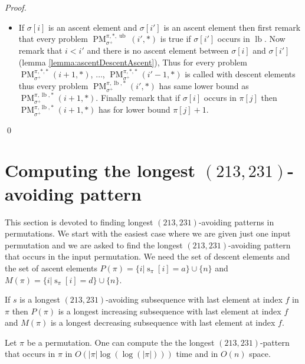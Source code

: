 \documentclass[a4paper]{llncs}
\newcommand{\ptext}{\pi}
\newcommand{\pmotif}{\sigma}
\DeclareMathOperator{\stripea}{s}
\newcommand{\stripe}[2]{\stripea_{{#1}}[{#2}]}
\newcommand{\dstep}{d}
\newcommand{\ustep}{a}
\newcommand{\pbmotif}{\pmotif^+}
\DeclareMathOperator{\PMa}{PM}
\newcommand{\PM}[6]{\PMa_{{#1}}^{{#2},{#3},{#4}}({#5},{#6})}
\DeclareMathOperator{\lb}{lb}
\DeclareMathOperator{\ub}{ub}
\begin{document}
\begin{proof}
\begin{itemize}
\begin{itemize}
			\item If $\pmotif[i]$ is an ascent element and $\pmotif[i']$ is an ascent element then
			first remark that every problem 
			$\PM{\pbmotif}{\ptext}{*}{\ub}{i'}{*}$ is true if $\sigma[i']$ occurs in $\lb$.
			Now remark that
			$i<i'$ and there is no  ascent element between $\pmotif[i]$ and $\pmotif[i']$ (lemma \ref{lemma:ascentDescentAscent}), 
			Thus for every problem $\PM{\pbmotif}{\ptext}{*}{*}{i+1}{*}$, $\dots$, $\PM{\pbmotif}{\ptext}{*}{*}{i'-1}{*}$ is called with descent elements
			thus every problem 
			$\PM{\pbmotif}{\ptext}{\lb}{*}{i'}{*}$ has same lower bound as $\PM{\pbmotif}{\ptext}{\lb}{*}{i+1}{*}$.
			Finally remark that if $\pmotif[i]$ occurs in $\ptext[j]$ then  $\PM{\pbmotif}{\ptext}{\lb}{*}{i+1}{*}$ has for lower bound $\ptext[j]+1$.			
		\end{itemize}
\end{itemize}
\qed
\end{proof}


\section{Computing the longest $(213,231)$-avoiding pattern}
\label{section:LCS}

	This section is devoted to finding longest $(213,231)$-avoiding patterns 
	in permutations.
	We start with the easiest case where we are given just one input permutation
	and we are asked to find the longest $(213,231)$-avoiding pattern that 
	occurs in the input permutation.
	We need the set of descent elements and the set of ascent elements
	$P(\pi) = \{i | \stripe{\pi}{i} = \ustep \} \cup \{n\}$ and
	$M(\pi) = \{i | \stripe{\pi}{i} = \dstep \} \cup \{n\}$.\\

	\begin{proposition}
	\label{proposition:longestIncreasingSubsequence}
	If $s$ is a longest $(213,231)$-avoiding subsequence with last element at index 
	$f$ in $\pi$ then
	$P(\pi)$ is a longest increasing subsequence with last element at index $f$ and
	$M(\pi)$ is a longest decreasing subsequence with last element at index $f$.
	\end{proposition}

	\begin{proposition}
	\label{proposition:longest 2}
	Let $\pi$ be a permutation. One can compute the
	the longest $(213,231)$-pattern that occurs in $\pi$
	in $O(|\ptext|\log(\log(|\ptext|)))$ time and in $O(n)$ space.
	\end{proposition}
\end{document}
